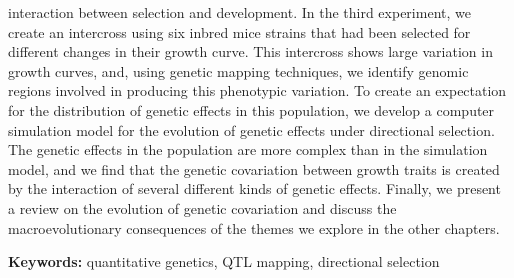 interaction between selection and development. In the third experiment, we create an intercross using six inbred mice strains that had been selected for different changes in their growth curve. This intercross shows large variation in growth curves, and, using genetic mapping techniques, we identify genomic regions involved in producing this phenotypic variation. To create an expectation for the distribution of genetic effects in this population, we develop a computer simulation model for the evolution of genetic effects under directional selection. The genetic effects in the population are more complex than in the simulation model, and we find that the genetic covariation between growth traits is created by the interaction of several different kinds of genetic effects. Finally, we present a review on the evolution of genetic covariation and discuss the macroevolutionary consequences of the themes we explore in the other chapters.
\par
\vspace{1em}
\noindent\textbf{Keywords:} quantitative genetics, QTL mapping, directional selection


\newpage


\listoffigures

\listoftables


\tableofcontents

